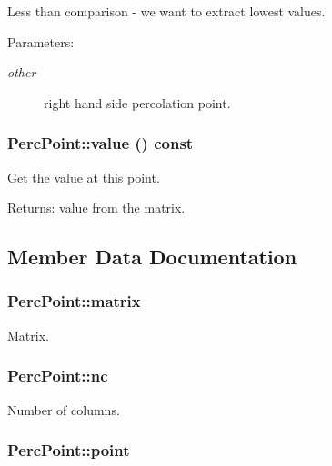 Less than comparison - we want to extract lowest values. \begin{Desc}
\item[Parameters:]
\begin{description}
\item[{\em other}]right hand side percolation point. \end{description}
\end{Desc}
\hypertarget{class_perc_point_0099784a4e3728c1f28b546a5b94104a}{
\subsubsection[{value}]{ PercPoint::value () const}}
\label{class_perc_point_0099784a4e3728c1f28b546a5b94104a}


Get the value at this point. \begin{Desc}
\item[Returns:]value from the matrix. \end{Desc}


\subsection{Member Data Documentation}
\hypertarget{class_perc_point_730c461b6a04bcb883d60df9b297b5d5}{
\subsubsection[{matrix}]{ {\bf PercPoint::matrix}}}
\label{class_perc_point_730c461b6a04bcb883d60df9b297b5d5}


Matrix. \hypertarget{class_perc_point_dc46d54bf942be6e7774ae522e563f87}{
\subsubsection[{nc}]{ {\bf PercPoint::nc}}}
\label{class_perc_point_dc46d54bf942be6e7774ae522e563f87}


Number of columns. \hypertarget{class_perc_point_6f5497e144144fa0f0e5e4783ab30761}{
\subsubsection[{point}]{ {\bf PercPoint::point}}}
\label{class_perc_point_6f5497e144144fa0f0e5e4783ab30761}


